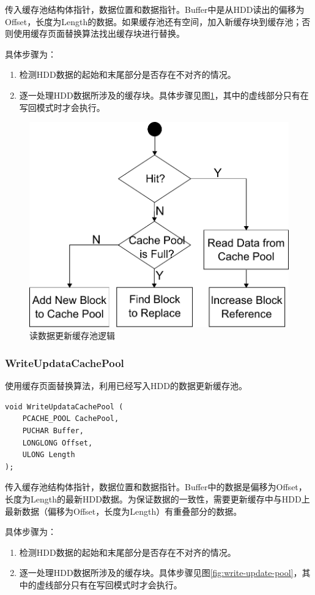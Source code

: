 传入缓存池结构体指针，数据位置和数据指针。Buffer中是从HDD读出的偏移为Offset，长度为Length的数据。如果缓存池还有空间，加入新缓存块到缓存池；否则使用缓存页面替换算法找出缓存块进行替换。

具体步骤为：
\begin{enumerate}
\item 检测HDD数据的起始和末尾部分是否存在不对齐的情况。
\item 逐一处理HDD数据所涉及的缓存块。具体步骤见图\ref{fig:read-update-pool}，其中的虚线部分只有在写回模式时才会执行。
\end{enumerate}

\begin{figure}[!ht]
\centering
\includegraphics[width=0.6\linewidth]{./graph/read-update-pool}
\caption{读数据更新缓存池逻辑}
\label{fig:read-update-pool}
\end{figure}

\subsubsection{WriteUpdataCachePool}
使用缓存页面替换算法，利用已经写入HDD的数据更新缓存池。
\begin{lstlisting}
void WriteUpdataCachePool (
    PCACHE_POOL CachePool,
    PUCHAR Buffer,
    LONGLONG Offset,
    ULONG Length
);
\end{lstlisting}

传入缓存池结构体指针，数据位置和数据指针。Buffer中的数据是偏移为Offset，长度为Length的最新HDD数据。为保证数据的一致性，需要更新缓存中与HDD上最新数据（偏移为Offset，长度为Length）有重叠部分的数据。

具体步骤为：
\begin{enumerate}
\item 检测HDD数据的起始和末尾部分是否存在不对齐的情况。
\item 逐一处理HDD数据所涉及的缓存块。具体步骤见图\ref{fig:write-update-pool}，其中的虚线部分只有在写回模式时才会执行。
\end{enumerate}

